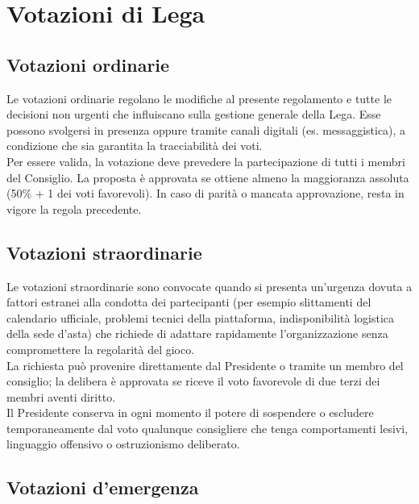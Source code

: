 \chapter{Votazioni di Lega}
\label{cap:Votazioni}

\section{Votazioni ordinarie}
\label{art:2.1}

Le votazioni ordinarie regolano le modifiche al presente regolamento e tutte le decisioni non urgenti che influiscano sulla gestione generale della Lega. Esse possono svolgersi in presenza oppure tramite canali digitali (es. messaggistica), a condizione che sia garantita la tracciabilità dei voti.\\

Per essere valida, la votazione deve prevedere la partecipazione di tutti i membri del Consiglio. La proposta è approvata se ottiene almeno la maggioranza assoluta (50\% + 1 dei voti favorevoli). In caso di parità o mancata approvazione, resta in vigore la regola precedente.

\section{Votazioni straordinarie}
\label{art:2.2}

Le votazioni straordinarie sono convocate quando si presenta un'urgenza dovuta a fattori estranei alla condotta dei partecipanti (per esempio slittamenti del calendario ufficiale, problemi tecnici della piattaforma, indisponibilità logistica della sede d'asta) che richiede di adattare rapidamente l'organizzazione senza compromettere la regolarità del gioco.\\

La richiesta può provenire direttamente dal Presidente o tramite un membro del consiglio; la delibera è approvata se riceve il voto favorevole di due terzi dei membri aventi diritto.\\

Il Presidente conserva in ogni momento il potere di sospendere o escludere temporaneamente dal voto qualunque consigliere che tenga comportamenti lesivi, linguaggio offensivo o ostruzionismo deliberato.

\section{Votazioni d’emergenza}
\label{art:2.3}


